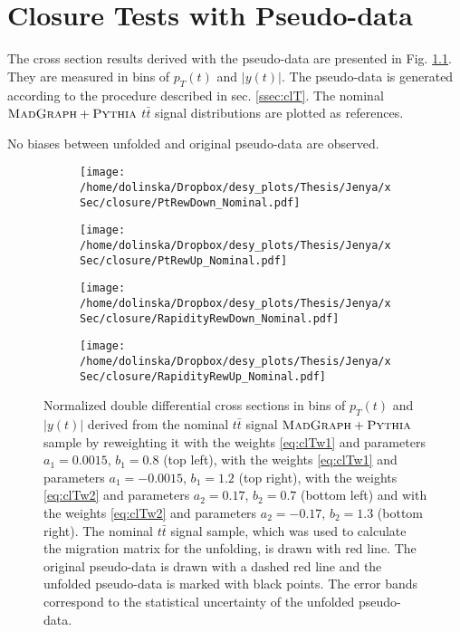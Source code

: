 \chapter{Closure Tests with Pseudo-data}\label{appendix:closT}

The cross section results derived with the pseudo-data are presented in Fig. \ref{fig:closT}. They are measured in bins 
of $p_{T}(t)$ and $|y(t)|$. The pseudo-data is generated according to the procedure described in sec. \ref{ssec:clT}.
The nominal $\textsc{MadGraph}+\textsc{Pythia}$ $t\bar{t}$ signal distributions are plotted as references.

No biases between unfolded and original pseudo-data are observed.

\begin{figure}[p]
\centering
\begin{subfigure}
  \centering
  \texttt{[image: /home/dolinska/Dropbox/desy\_plots/Thesis/Jenya/xSec/closure/PtRewDown\_Nominal.pdf]}
\end{subfigure}
\begin{subfigure}
  \centering
  \texttt{[image: /home/dolinska/Dropbox/desy\_plots/Thesis/Jenya/xSec/closure/PtRewUp\_Nominal.pdf]}
\end{subfigure}
\begin{subfigure}
  \centering
  \texttt{[image: /home/dolinska/Dropbox/desy\_plots/Thesis/Jenya/xSec/closure/RapidityRewDown\_Nominal.pdf]}
\end{subfigure}
\begin{subfigure}
  \centering
  \texttt{[image: /home/dolinska/Dropbox/desy\_plots/Thesis/Jenya/xSec/closure/RapidityRewUp\_Nominal.pdf]}
\end{subfigure}
\caption{Normalized double differential cross sections in bins of $p_{T}(t)$ and $|y(t)|$ derived from the nominal $t\bar{t}$ signal $\textsc{MadGraph}+\textsc{Pythia}$
         sample by reweighting it with the weights \ref{eq:clTw1} and parameters  $a_{1} = 0.0015$, $b_{1} = 0.8$ (top left), 
         with the weights \ref{eq:clTw1} and parameters  $a_{1} = -0.0015$, $b_{1} = 1.2$ (top right), with the weights \ref{eq:clTw2} and parameters 
         $a_{2} = 0.17$, $b_{2} = 0.7$ (bottom left) and with the weights \ref{eq:clTw2} and parameters  $a_{2} = -0.17$, $b_{2} = 1.3$ (bottom right).
         The nominal $t\bar{t}$ signal sample, which was used to calculate the migration matrix for the unfolding, is drawn with red line. The original
         pseudo-data is drawn with a dashed red line and the unfolded pseudo-data is marked with black points. The error bands correspond to the statistical
         uncertainty of the unfolded pseudo-data.}
\label{fig:closT}
\end{figure}